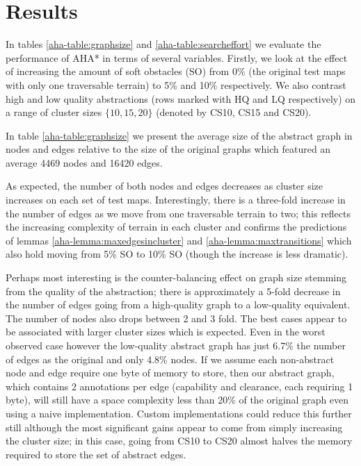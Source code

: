 \section{Results}
In tables \ref{aha-table:graphsize} and \ref{aha-table:searcheffort} we evaluate the performance of AHA* in terms of several variables. 
Firstly, we look at the effect of increasing the amount of soft obstacles (SO) from 0\% (the original test maps with only one traversable terrain) to 5\% and 10\% respectively. 
We also contrast high and low quality abstractions (rows marked with HQ and LQ respectively) on a range of cluster sizes $\lbrace 10, 15, 20 \rbrace$ (denoted by CS10, CS15 and CS20).
\par \indent
In table \ref{aha-table:graphsize} we present the average size of the abstract graph in nodes and edges relative to the size of the original graphs which featured an average 4469 nodes and 16420 edges. 

As expected, the number of both nodes and edges decreases as cluster size increases on each set of test maps. Interestingly, there is a three-fold increase in the number of edges as we move from one traversable terrain to two; this reflects the increasing complexity of terrain in each cluster and confirms the predictions of lemmas \ref{aha-lemma:maxedgesincluster} and \ref{aha-lemma:maxtransitions} which also hold moving from 5\% SO to 10\% SO (though the increase is less dramatic). 
\par \indent
Perhaps most interesting is the counter-balancing effect on graph size stemming from the quality of the abstraction; there is approximately a 5-fold decrease in the number of edges going from a high-quality graph to a low-quality equivalent.
The number of nodes also drops between 2 and 3 fold. 
The best cases appear to be associated with larger cluster sizes which is expected. 
Even in the worst observed case however the low-quality abstract graph has just 6.7\% the number of edges as the original and only 4.8\% nodes. 
If we assume each non-abstract node and edge require one byte of memory to store, then our abstract graph, which contains 2 annotations per edge (capability and clearance, each requiring 1 byte), will still have a space complexity less than 20\% of the original graph even using a naive implementation. 
Custom implementations could reduce this further still although the most significant gains appear to come from simply increasing the cluster size; in this case, going from CS10 to CS20 almost halves the memory required to store the set of abstract edges.
\par \indent
